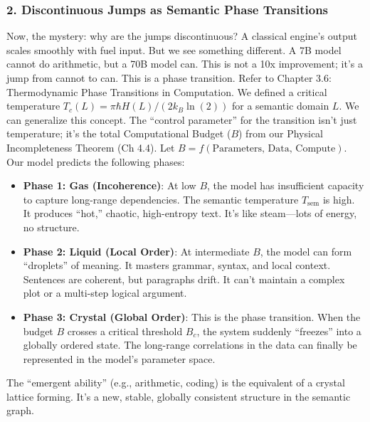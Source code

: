 \documentclass[11pt,letterpaper]{article}
\begin{document}
\subsubsection*{2. Discontinuous Jumps as Semantic Phase Transitions}
Now, the mystery: why are the jumps discontinuous? A classical engine’s output scales smoothly with fuel input. But we see something different. A 7B model cannot do arithmetic, but a 70B model can. This is not a 10x improvement; it’s a jump from cannot to can. This is a phase transition. Refer to Chapter 3.6: Thermodynamic Phase Transitions in Computation. We defined a critical temperature $T_c(L) = \pi\hbar H(L) / (2k_B \ln(2))$ for a semantic domain $L$. We can generalize this concept. The “control parameter” for the transition isn’t just temperature; it’s the total Computational Budget ($B$) from our Physical Incompleteness Theorem (Ch 4.4). Let $B = f(\text{Parameters, Data, Compute})$. Our model predicts the following phases:
\begin{itemize}
    \item \textbf{Phase 1: Gas (Incoherence)}: At low $B$, the model has insufficient capacity to capture long-range dependencies. The semantic temperature $T_{\text{sem}}$ is high. It produces “hot,” chaotic, high-entropy text. It’s like steam—lots of energy, no structure.
    \item \textbf{Phase 2: Liquid (Local Order)}: At intermediate $B$, the model can form “droplets” of meaning. It masters grammar, syntax, and local context. Sentences are coherent, but paragraphs drift. It can’t maintain a complex plot or a multi-step logical argument.
    \item \textbf{Phase 3: Crystal (Global Order)}: This is the phase transition. When the budget $B$ crosses a critical threshold $B_c$, the system suddenly “freezes” into a globally ordered state. The long-range correlations in the data can finally be represented in the model’s parameter space.
\end{itemize}
The “emergent ability” (e.g., arithmetic, coding) is the equivalent of a crystal lattice forming. It’s a new, stable, globally consistent structure in the semantic graph.
\end{document}
